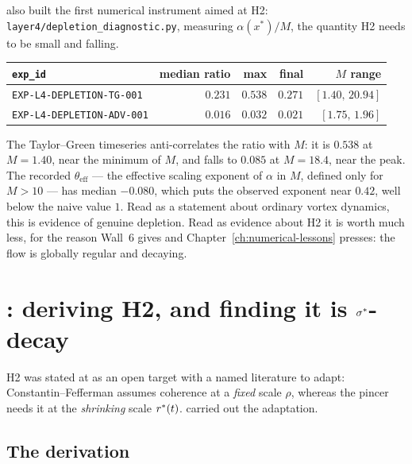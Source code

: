 also built the first numerical instrument aimed at H2:
\texttt{layer4/depletion\_diagnostic.py}, measuring \(\alpha(x^*)/M\), the
quantity H2 needs to be small and falling.

\begin{center}
\small
\begin{tabular}{@{}l r r r r@{}}
\toprule
\texttt{exp\_id} & median ratio & max & final & \(M\) range \\
\midrule
\texttt{EXP-L4-DEPLETION-TG-001} & \(0.231\) & \(0.538\) & \(0.271\)
  & \([1.40,\,20.94]\) \\
\texttt{EXP-L4-DEPLETION-ADV-001} & \(0.016\) & \(0.032\) & \(0.021\)
  & \([1.75,\,1.96]\) \\
\bottomrule
\end{tabular}
\end{center}

\medskip
The Taylor--Green timeseries anti-correlates the ratio with \(M\): it is
\(0.538\) at \(M=1.40\), near the minimum of \(M\), and falls to \(0.085\) at
\(M=18.4\), near the peak. The recorded \(\theta_{\mathrm{eff}}\) --- the
effective scaling exponent of \(\alpha\) in \(M\), defined only for \(M>10\)
--- has median \(-0.080\), which puts the observed exponent near \(0.42\),
well below the naive value \(1\). Read as a statement about ordinary vortex
dynamics, this is evidence of genuine depletion. Read as evidence about H2 it
is worth much less, for the reason Wall~6 gives and
Chapter~\ref{ch:numerical-lessons} presses: the flow is globally regular and
decaying.

\section{\texorpdfstring{: deriving H2, and finding it is \(\sigma^{*}\)-decay}{S37: deriving H2, and finding it is sigma-star-decay}}
\label{sec:s37}

H2 was stated at  as an open target with a named literature to adapt:
Constantin--Fefferman assumes coherence at a \emph{fixed} scale \(\rho\),
whereas the pincer needs it at the \emph{shrinking} scale \(r^{*}(t)\).
 carried out the adaptation.

\subsection{The derivation}

